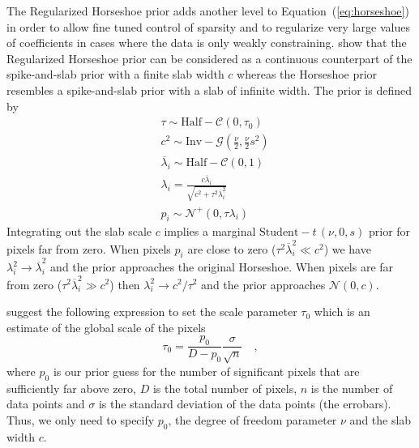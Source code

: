 \documentclass[modern]{aastex62}
\begin{document}
The Regularized Horseshoe prior adds another level to Equation~(\ref{eq:horseshoe}) in order to allow fine tuned control of sparsity and to regularize very large values of coefficients in cases where the data is only weakly constraining.
\cite{piironen2017} show that the Regularized Horseshoe prior can be considered as a continuous counterpart of the spike-and-slab prior with a finite slab width $c$ whereas the Horseshoe prior resembles a spike-and-slab prior with a slab of infinite width.
The prior is defined by
\begin{equation}
\begin{aligned}
    &\tau  \sim \mathrm{Half}-\mathcal{C}\left(0, \tau_{0}\right)\\
    &c^{2}  \sim \mathrm{Inv}-\mathcal{G}\left(\frac{\nu}{2}, \frac{\nu}{2} s^{2}\right) \\
    &\overline{\lambda}_{i}  \sim \mathrm{Half}-\mathcal{C}(0,1)\\
    &\lambda_{i} =\frac{c \overline{\lambda}_{i}}{\sqrt{c^{2}+\tau^{2} \overline{\lambda}_{i}^{2}}} \\
    &p_{i}  \sim \mathcal{N}^+\left(0, \tau \lambda_{i}\right) 
\end{aligned}
    \label{eq:reg_horseshoe}
\end{equation}
Integrating out the slab scale $c$ implies a marginal $\mathrm{Student}-\mathit{t}\,(\nu,0,s)$ prior for pixels far from zero.
When pixels $p_i$ are close to zero ($\tau^2\overline{\lambda}_i^2\ll c^2$) we have $\lambda_i^2\rightarrow\overline{\lambda}_i^2$ and the prior approaches the original Horseshoe.
When pixels are far from zero ($\tau^2\overline{\lambda}_i^2\gg c^2$) then $\lambda_i^2\rightarrow c^2/\tau^2$ and the prior approaches $\mathcal{N}(0, c)$.

\cite{piironen2017} suggest the following expression to set the scale parameter $\tau_0$ which is an estimate of the global scale of the pixels 
\begin{equation}
    \tau_0=\frac{p_0}{D-p_0}\frac{\sigma}{\sqrt{n}}
    \quad,
    \label{eq:horseshoe_tau0}
\end{equation}
where $p_0$ is our prior guess for the number of significant pixels that are sufficiently far above zero, $D$ is the total number of pixels, $n$ is the number of data points and $\sigma$ is the standard deviation of the data points (the errobars).
Thus, we only need to specify $p_0$, the degree of freedom parameter $\nu$ and the slab width $c$.
\end{document}
